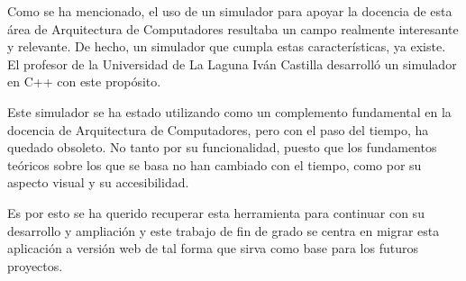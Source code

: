 Como se ha mencionado, el uso de un simulador para apoyar la docencia de esta área
de Arquitectura de Computadores resultaba un campo realmente interesante y relevante. 
De hecho, un simulador que cumpla estas características, ya existe. El profesor 
de la Universidad de La Laguna Iván Castilla desarrolló un simulador en C++ con este propósito.

\bigskip
Este simulador se ha estado utilizando como un complemento fundamental en la docencia
de Arquitectura de Computadores, pero con el paso del tiempo, ha quedado obsoleto. 
No tanto por su funcionalidad, puesto que los fundamentos teóricos sobre los que 
se basa no han cambiado con el tiempo, como por su aspecto visual y su accesibilidad.

\bigskip
Es por esto se ha querido recuperar esta herramienta para continuar con su desarrollo 
y ampliación y este trabajo de fin de grado se centra en migrar esta aplicación a versión 
web de tal forma que sirva como base para los futuros proyectos.
